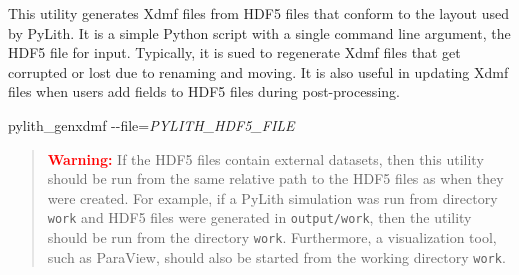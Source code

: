 This utility generates Xdmf files from HDF5 files that conform to
the layout used by PyLith. It is a simple Python script with a single
command line argument, the HDF5 file for input. Typically, it is sued
to regenerate Xdmf files that get corrupted or lost due to renaming
and moving. It is also useful in updating Xdmf files when users add
fields to HDF5 files during post-processing.
\begin{lyxcode}
pylith\_genxdmf -{}-file=\textit{PYLITH\_HDF5\_FILE}\end{lyxcode}
\begin{quote}
\textbf{\textcolor{red}{Warning:}}\textbf{ }If the HDF5 files contain
external datasets, then this utility should be run from the same relative
path to the HDF5 files as when they were created. For example, if
a PyLith simulation was run from directory \texttt{work} and HDF5
files were generated in \texttt{output/work}, then the utility should
be run from the directory \texttt{work}. Furthermore, a visualization
tool, such as ParaView, should also be started from the working directory
\texttt{work}.\end{quote}

